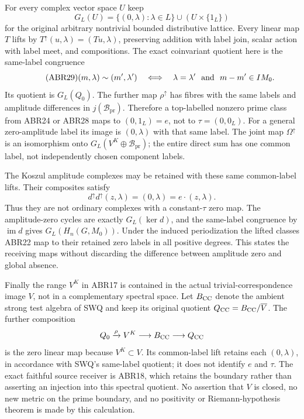 \documentclass[11pt]{article}
\begin{document}
For every complex vector space $U$ keep
\[
 G_L(U)=\{(0,\lambda):\lambda\in L\}\cup(U\times\{1_L\})
\]
for the original arbitrary nontrivial bounded distributive lattice.
Every linear map $T$ lifts by
$T^\uparrow(u,\lambda)=(Tu,\lambda)$, preserving addition with
label join, scalar action with label meet, and compositions.
The exact coinvariant quotient here is the same-label congruence
\begin{equation}\tag{ABR29}
 (m,\lambda)\sim(m',\lambda')
 \quad\Longleftrightarrow\quad
 \lambda=\lambda'\ \hbox{ and }\ m-m'\in IM_0.
\end{equation}
Its quotient is $G_L(Q_0)$. The further map $\rho^\uparrow$ has
fibres with the same labels and amplitude differences in
$j(\mathcal B_{\mathrm{pr}})$. Therefore a top-labelled nonzero
prime class from ABR24 or ABR28 maps to $(0,1_L)=e$, not
to $\tau=(0,0_L)$. For a general zero-amplitude label its image
is $(0,\lambda)$ with that same label. The joint map
$\Omega^\uparrow$ is an isomorphism onto
$G_L(V^K\oplus\mathcal B_{\mathrm{pr}})$; the entire direct sum
has one common label, not independently chosen component labels.

The Koszul amplitude complexes may be retained with these same
common-label lifts. Their composites satisfy
\begin{equation}\tag{ABR30}
 d^\uparrow d^\uparrow(z,\lambda)=(0,\lambda)
                                  =e\cdot(z,\lambda).
\end{equation}
Thus they are not ordinary complexes with a constant-$\tau$
zero map. The amplitude-zero cycles are exactly $G_L(\ker d)$,
and the same-label congruence by $\operatorname{im}d$ gives
$G_L(H_n(G,M_0))$. Under the induced periodization the lifted
classes ABR22 map to their retained zero labels in all positive
degrees. This states the receiving maps without discarding the
difference between amplitude zero and global absence.

Finally the range $V^K$ in ABR17 is contained in the actual
trivial-correspondence image $V$, not in a complementary spectral
space. Let $B_{\rm CC}$ denote the ambient strong test algebra
of SWQ and keep its original quotient
$Q_{\rm CC}=B_{\rm CC}/\overline V$. The further composition
\[
 Q_0\xrightarrow{\rho}V^K\longrightarrow B_{\rm CC}
                            \longrightarrow Q_{\rm CC}
\]
is the zero linear map because $V^K\subset V$. Its common-label
lift retains each $(0,\lambda)$, in accordance with SWQ's
same-label quotient; it does not identify $e$ and $\tau$.
The exact faithful source receiver is ABR18, which retains the
boundary rather than asserting an injection into this spectral
quotient. No assertion that $V$ is closed, no new metric on the
prime boundary, and no positivity or Riemann-hypothesis theorem
is made by this calculation.
\end{document}
